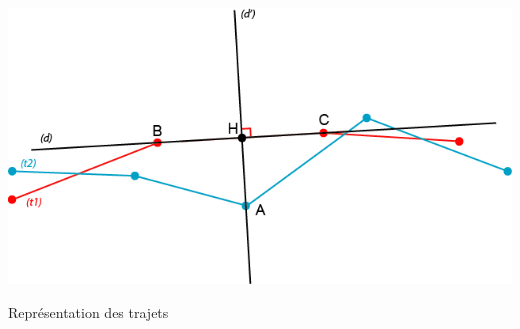 \begin{img}  
	\includegraphics[scale=1]{img/Trajet.png}
	\caption{Représentation des trajets}
	\label{Représentation des trajets}
\end{img}

